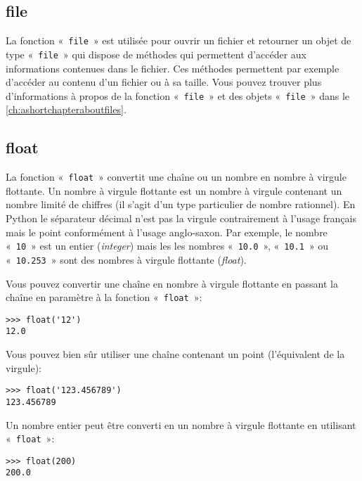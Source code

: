 \subsection*{file}

La fonction «~\texttt{file}~» est utilisée pour ouvrir un fichier et retourner un objet de type «~\texttt{file}~» qui dispose de méthodes qui permettent d'accéder aux informations contenues dans le fichier. Ces méthodes permettent par exemple d'accéder au contenu d'un fichier ou à sa taille. Vous pouvez trouver plus d'informations à propos de la fonction «~\texttt{file}~» et des objets «~\texttt{file}~» dans le \autoref{ch:ashortchapteraboutfiles}.

\subsection*{float}

La fonction «~\texttt{float}~» convertit une chaîne ou un nombre en nombre à virgule flottante. Un nombre à virgule flottante est un nombre à virgule contenant un nombre limité de chiffres (il s'agit d'un type particulier de nombre rationnel). En Python le séparateur décimal n'est pas la virgule contrairement à l'usage français mais le point conformément à l'usage anglo-saxon. Par exemple, le nombre «~\texttt{10}~» est un entier (\emph{integer}) mais les les nombres «~\texttt{10.0}~», «~\texttt{10.1}~» ou «~\texttt{10.253}~» sont des nombres à virgule flottante (\emph{float}).

Vous pouvez convertir une chaîne en nombre à virgule flottante en passant la chaîne en paramètre à la fonction «~\texttt{float}~»: 
\begin{Verbatim}[frame=single,rulecolor=\color{gray}]
>>> float('12')
12.0
\end{Verbatim}

Vous pouvez bien sûr utiliser une chaîne contenant un point (l'équivalent de la virgule):

\begin{Verbatim}[frame=single,rulecolor=\color{gray}]
>>> float('123.456789')
123.456789
\end{Verbatim}

Un nombre entier peut être converti en un nombre à virgule flottante en utilisant «~\texttt{float}~»: 
\begin{Verbatim}[frame=single,rulecolor=\color{gray}]
>>> float(200)
200.0
\end{Verbatim}

